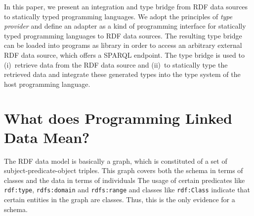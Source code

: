 \documentclass{llncs} %
\begin{document}
%
%
%
%

In this paper, we present an integration and type bridge from RDF data sources to
statically typed programming languages. We adopt the principles of \emph{type provider}
and define an adapter as a kind of programming interface
for statically typed programming languages to RDF data sources.
The resulting type bridge can be loaded into
programs as library in order to access an arbitrary external RDF data source,
which offers a SPARQL endpoint. The type bridge is used to (i)~retrieve data
from the RDF data source and (ii)~to statically type the retrieved data
and integrate these generated types into the type system of the host programming language.


\section{What does Programming Linked Data Mean?}
\label{sec:context}


The RDF data model is basically a graph, which is constituted of a set of subject-predicate-object triples.
This graph covers both the schema in terms of classes and the data in terms of individuals
The usage of certain predicates like \texttt{rdf:type}, \texttt{rdfs:domain} and \texttt{rdfs:range}
and classes like \texttt{rdf:Class} indicate that certain entities in the graph are classes.
Thus, this is the only evidence for a schema.
\end{document}
